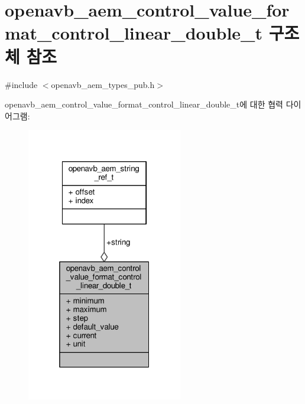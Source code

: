 \hypertarget{structopenavb__aem__control__value__format__control__linear__double__t}{}\section{openavb\+\_\+aem\+\_\+control\+\_\+value\+\_\+format\+\_\+control\+\_\+linear\+\_\+double\+\_\+t 구조체 참조}
\label{structopenavb__aem__control__value__format__control__linear__double__t}


{\ttfamily \#include $<$openavb\+\_\+aem\+\_\+types\+\_\+pub.\+h$>$}



openavb\+\_\+aem\+\_\+control\+\_\+value\+\_\+format\+\_\+control\+\_\+linear\+\_\+double\+\_\+t에 대한 협력 다이어그램\+:
\nopagebreak
\begin{figure}[H]
\begin{center}
\leavevmode
\includegraphics[width=193pt]{structopenavb__aem__control__value__format__control__linear__double__t__coll__graph}
\end{center}
\end{figure}
